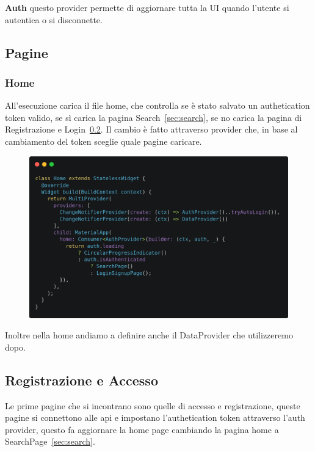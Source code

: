 \documentclass[a4paper,12pt]{article}
\begin{document}
\textbf{Auth} questo provider permette di aggiornare tutta la UI quando l'utente si autentica o si disconnette.

\newpage

\subsection{Pagine}

\subsubsection{Home}


All'esecuzione carica il file home, che controlla se è stato salvato un authetication token valido, se sì carica la pagina Search~\ref{sec:search}, se no carica la pagina di Registrazione e Login~\ref{sec:login}. Il cambio è fatto attraverso provider che, in base al cambiamento del token sceglie quale pagine caricare.


\begin{figure}[h]
    \centering
        \includegraphics[width=0.9\linewidth]{img/home.png}
\end{figure}


Inoltre nella home andiamo a definire anche il DataProvider che utilizzeremo dopo.

\newpage

\subsection{Registrazione e Accesso}
\label{sec:login}

Le prime pagine che si incontrano sono quelle di accesso e registrazione, queste pagine si connettono alle api e impostano l'authetication token attraverso l'auth provider, questo fa aggiornare la home page cambiando la pagina home a SearchPage~\ref{sec:search}.
\end{document}
